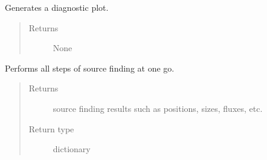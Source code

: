 \documentclass[a4paper,12pt,english]{sphinxmanual}
\begin{document}
\begin{fulllineitems}
\begin{fulllineitems}
\end{fulllineitems}


\begin{fulllineitems}
\label{analysis:analysis.sourceFinder.sourceFinder.plot}
Generates a diagnostic plot.
\begin{quote}\begin{description}
\item[{Returns}] \leavevmode
None

\end{description}\end{quote}

\end{fulllineitems}


\begin{fulllineitems}
\label{analysis:analysis.sourceFinder.sourceFinder.runAll}
Performs all steps of source finding at one go.
\begin{quote}\begin{description}
\item[{Returns}] \leavevmode
source finding results such as positions, sizes, fluxes, etc.

\item[{Return type}] \leavevmode
dictionary

\end{description}\end{quote}

\end{fulllineitems}


\end{fulllineitems}

\end{document}
